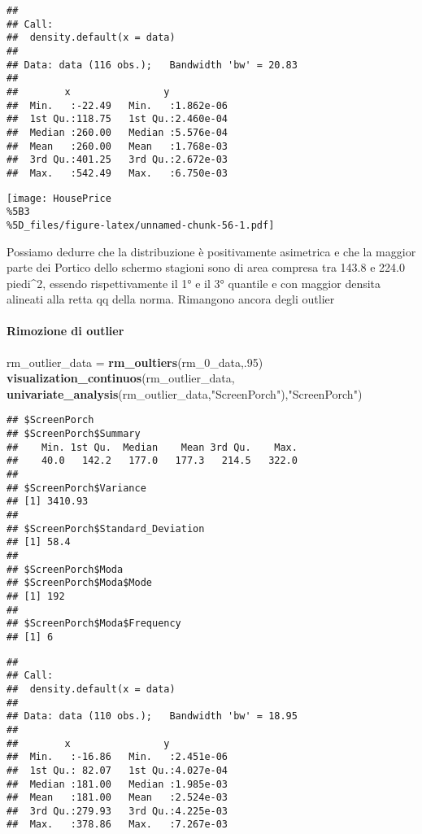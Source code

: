 \documentclass[
]{article}
\newenvironment{Shaded}{\begin{snugshade}}{\end{snugshade}}
\newcommand{\DecValTok}[1]{\textcolor[rgb]{0.00,0.00,0.81}{#1}}
\newcommand{\FunctionTok}[1]{\textcolor[rgb]{0.13,0.29,0.53}{\textbf{#1}}}
\newcommand{\NormalTok}[1]{#1}
\newcommand{\OtherTok}[1]{\textcolor[rgb]{0.56,0.35,0.01}{#1}}
\newcommand{\StringTok}[1]{\textcolor[rgb]{0.31,0.60,0.02}{#1}}
\begin{document}
\begin{verbatim}
## 
## Call:
##  density.default(x = data)
## 
## Data: data (116 obs.);   Bandwidth 'bw' = 20.83
## 
##        x                y            
##  Min.   :-22.49   Min.   :1.862e-06  
##  1st Qu.:118.75   1st Qu.:2.460e-04  
##  Median :260.00   Median :5.576e-04  
##  Mean   :260.00   Mean   :1.768e-03  
##  3rd Qu.:401.25   3rd Qu.:2.672e-03  
##  Max.   :542.49   Max.   :6.750e-03
\end{verbatim}

\texttt{[image: HousePrice\\\%5B3\\\%5D\_files/figure-latex/unnamed-chunk-56-1.pdf]}

Possiamo dedurre che la distribuzione è positivamente asimetrica e che
la maggior parte dei Portico dello schermo stagioni sono di area
compresa tra 143.8 e 224.0 piedi\^{}2, essendo rispettivamente il 1° e
il 3° quantile e con maggior densita alineati alla retta qq della norma.
Rimangono ancora degli outlier

\paragraph{Rimozione di outlier}\label{rimozione-di-outlier-13}

\begin{Shaded}
\begin{Highlighting}[]
\NormalTok{rm\_outlier\_data }\OtherTok{=} \FunctionTok{rm\_oultiers}\NormalTok{(rm\_0\_data,.}\DecValTok{95}\NormalTok{)}
\FunctionTok{visualization\_continuos}\NormalTok{(rm\_outlier\_data, }\FunctionTok{univariate\_analysis}\NormalTok{(rm\_outlier\_data,}\StringTok{"ScreenPorch"}\NormalTok{),}\StringTok{"ScreenPorch"}\NormalTok{)}
\end{Highlighting}
\end{Shaded}

\begin{verbatim}
## $ScreenPorch
## $ScreenPorch$Summary
##    Min. 1st Qu.  Median    Mean 3rd Qu.    Max. 
##    40.0   142.2   177.0   177.3   214.5   322.0 
## 
## $ScreenPorch$Variance
## [1] 3410.93
## 
## $ScreenPorch$Standard_Deviation
## [1] 58.4
## 
## $ScreenPorch$Moda
## $ScreenPorch$Moda$Mode
## [1] 192
## 
## $ScreenPorch$Moda$Frequency
## [1] 6
\end{verbatim}

\begin{verbatim}
## 
## Call:
##  density.default(x = data)
## 
## Data: data (110 obs.);   Bandwidth 'bw' = 18.95
## 
##        x                y            
##  Min.   :-16.86   Min.   :2.451e-06  
##  1st Qu.: 82.07   1st Qu.:4.027e-04  
##  Median :181.00   Median :1.985e-03  
##  Mean   :181.00   Mean   :2.524e-03  
##  3rd Qu.:279.93   3rd Qu.:4.225e-03  
##  Max.   :378.86   Max.   :7.267e-03
\end{verbatim}
\end{document}
